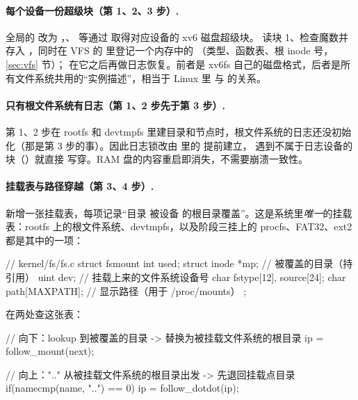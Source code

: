 \paragraph{每个设备一份超级块（第 1、2、3 步）.} 全局的  改为 ，、 等通过  取得对应设备的 xv6 磁盘超级块。 读块 1、检查魔数并存入 ，同时在 VFS 的  里登记一个内存中的 （类型、函数表、根 inode 号，\ref{sec:vfs} 节）； 在它之后再做日志恢复。前者是 xv6fs 自己的磁盘格式，后者是所有文件系统共用的“实例描述”，相当于 Linux 里  与  的关系。

\paragraph{只有根文件系统有日志（第 1、2 步先于第 3 步）.} 第 1、2 步在 rootfs 和 devtmpfs 里建目录和节点时，根文件系统的日志还没初始化（那是第 3 步的事）。因此日志锁改由  里的  提前建立， 遇到不属于日志设备的块（）就直接  写穿。RAM 盘的内容重启即消失，不需要崩溃一致性。

\paragraph{挂载表与路径穿越（第 3、4 步）.}  新增一张挂载表，每项记录“目录  被设备  的根目录覆盖”。这是系统里\emph{唯一}的挂载表：rootfs 上的根文件系统、devtmpfs，以及阶段三挂上的 procfs、FAT32、ext2 都是其中的一项：

\begin{ccode}
// kernel/fs/fs.c
struct fsmount {
  int          used;
  struct inode *mp;           // 被覆盖的目录（持引用）
  uint         dev;           // 挂载上来的文件系统设备号
  char         fstype[12], source[24];
  char         path[MAXPATH]; // 显示路径（用于 /proc/mounts）
};
\end{ccode}

 在两处查这张表：

\begin{ccode}
// 向下：lookup 到被覆盖的目录 -> 替换为被挂载文件系统的根目录
ip = follow_mount(next);

// 向上：".." 从被挂载文件系统的根目录出发 -> 先退回挂载点目录
if(namecmp(name, "..") == 0)
    ip = follow_dotdot(ip);
\end{ccode}

